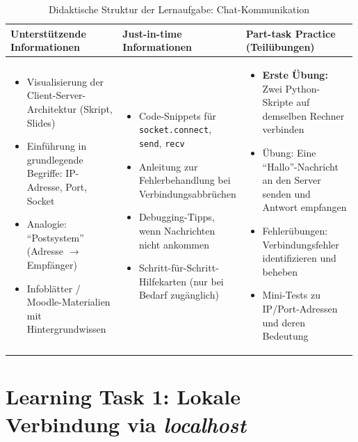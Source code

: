 \begin{table}[H]
    \centering
    \small
    \renewcommand{\arraystretch}{1.2}
    \begin{tabular}{p{0.33\linewidth}|p{0.33\linewidth}|p{0.33\linewidth}}
        \textbf{Unterstützende Informationen}                                                  & \textbf{Just-in-time Informationen} & \textbf{Part-task Practice (Teilübungen)} \\
        \midrule

        \begin{itemize}
            \item Visualisierung der Client-Server-Architektur (Skript, Slides)
            \item Einführung in grundlegende Begriffe: IP-Adresse, Port, Socket
            \item Analogie: \enquote{Postsystem} (Adresse $\rightarrow$ Empfänger)
            \item Infoblätter / Moodle-Materialien mit Hintergrundwissen
        \end{itemize}                 &
        \begin{itemize}
            \item Code-Snippets für \lstinline|socket.connect|, \lstinline|send|, \lstinline|recv|
            \item Anleitung zur Fehlerbehandlung bei Verbindungsabbrüchen
            \item Debugging-Tipps, wenn Nachrichten nicht ankommen
            \item Schritt-für-Schritt-Hilfekarten (nur bei Bedarf zugänglich)
        \end{itemize} &
        \begin{itemize}
            \item \textbf{Erste Übung:} Zwei Python-Skripte auf demselben Rechner verbinden
            \item Übung: Eine \enquote{Hallo}-Nachricht an den Server senden und Antwort empfangen
            \item Fehlerübungen: Verbindungsfehler identifizieren und beheben
            \item Mini-Tests zu IP/Port-Adressen und deren Bedeutung
        \end{itemize}
    \end{tabular}
    \caption{Didaktische Struktur der Lernaufgabe: Chat-Kommunikation}
\end{table}

\section{Learning Task 1: Lokale Verbindung via \textit{localhost}}

